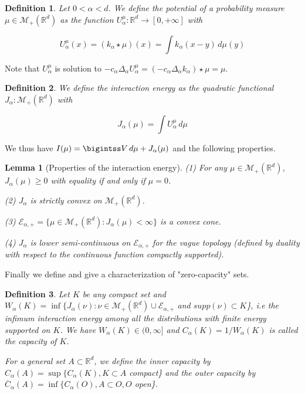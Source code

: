\documentclass[a4paper,12pt]{report}
\newtheorem*{lem}{Lemma}
\newtheorem*{deft}{Definition}
\begin{document}
\begin{deft} 

Let $0 < \alpha < d$. We define the potential of a probability measure $\mu \in \mathcal{M}_{+}(\mathbb{R}^{d})$ as the function $U_{\alpha}^{\mu} : \mathbb{R}^{d} \longrightarrow [0, +\infty]$ with

\[U_{\alpha}^{\mu}(x) = (k_{\alpha} \star \mu)(x) = \int k_{\alpha}(x-y)\,d\mu(y)\]
\end{deft}

Note that $U_{\alpha}^{\mu}$ is solution to $-c_{\alpha} \Delta_{\alpha} U_{\alpha}^{\mu} = (-c_{\alpha} \Delta_{\alpha} k_{\alpha})\star \mu = \mu$.

\begin{deft}

We define the interaction energy as the quadratic functional $J_{\alpha} : \mathcal{M}_{+}(\mathbb{R}^{d})$ with 

\[J_{\alpha}(\mu) = \int U_{\alpha}^{\mu}\,d\mu\]
\end{deft}

We thus have $I(\mu) = \bigintss V\,d\mu + J_{\alpha}(\mu)$ and the following properties.

\begin{lem}[Properties of the interaction energy]

(1) For any $\mu \in \mathcal{M}_{+}(\mathbb{R}^{d})$, $J_{\alpha}(\mu) \geq 0$ with equality if and only if $\mu = 0$.

(2) $J_{\alpha}$ is strictly convex on $\mathcal{M}_{+}(\mathbb{R}^{d})$.

(3) $\mathcal{E}_{\alpha, +} = \{\mu \in  \mathcal{M}_{+}(\mathbb{R}^{d}) : J_{\alpha}(\mu) < \infty\}$ is a convex cone.

(4) $J_{\alpha}$ is lower semi-continuous on $\mathcal{E}_{\alpha, +}$ for the vague topology (defined by duality with respect to the continuous function compactly supported).
\end{lem}

Finally we define and give a characterization of "zero-capacity" sets.

\begin{deft}

Let $K$ be any compact set and $W_{\alpha}(K) = \inf \{J_{\alpha}(\nu) : \nu \in \mathcal{M}_{+}(\mathbb{R}^{d}) \cup \mathcal{E}_{\alpha, +}$ and $supp(\nu) \subset K$\}, i.e the infimum interaction energy among all the distributions with finite energy supported on $K$. We have $W_{\alpha}(K) \in (0, \infty]$ and $C_{\alpha}(K) = 1/W_{\alpha}(K)$ is called the capacity of $K$.
\vspace{0.5cm}

For a general set $A \subset \mathbb{R}^{d}$, we define the inner capacity by $C_{\alpha}(A)  = \sup\{C_{\alpha}(K), K \subset A$ compact\} and the outer capacity by $\overline C_{\alpha}(A) = \inf \{C_{\alpha}(O), A \subset O, O$ open\}.
\end{deft}
\end{document}
